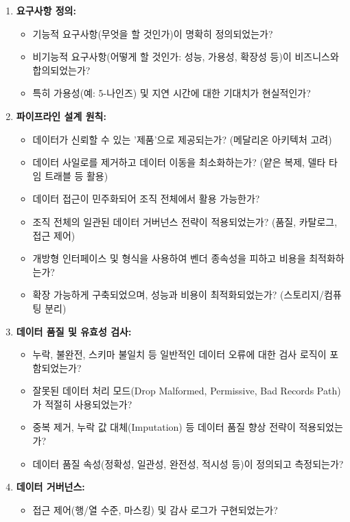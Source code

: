 \documentclass[11pt,a4paper]{article}
\begin{document}
\begin{enumerate}
\begin{enumerate}
    \item \textbf{요구사항 정의:}
    \begin{itemize}
        \item 기능적 요구사항(무엇을 할 것인가)이 명확히 정의되었는가?
        \item 비기능적 요구사항(어떻게 할 것인가: 성능, 가용성, 확장성 등)이 비즈니스와 합의되었는가?
        \item 특히 가용성(예: 5-나인즈) 및 지연 시간에 대한 기대치가 현실적인가?
    \end{itemize}
    \item \textbf{파이프라인 설계 원칙:}
    \begin{itemize}
        \item 데이터가 신뢰할 수 있는 '제품'으로 제공되는가? (메달리온 아키텍처 고려)
        \item 데이터 사일로를 제거하고 데이터 이동을 최소화하는가? (얕은 복제, 델타 타임 트래블 등 활용)
        \item 데이터 접근이 민주화되어 조직 전체에서 활용 가능한가?
        \item 조직 전체의 일관된 데이터 거버넌스 전략이 적용되었는가? (품질, 카탈로그, 접근 제어)
        \item 개방형 인터페이스 및 형식을 사용하여 벤더 종속성을 피하고 비용을 최적화하는가?
        \item 확장 가능하게 구축되었으며, 성능과 비용이 최적화되었는가? (스토리지/컴퓨팅 분리)
    \end{itemize}
    \item \textbf{데이터 품질 및 유효성 검사:}
    \begin{itemize}
        \item 누락, 불완전, 스키마 불일치 등 일반적인 데이터 오류에 대한 검사 로직이 포함되었는가?
        \item 잘못된 데이터 처리 모드(Drop Malformed, Permissive, Bad Records Path)가 적절히 사용되었는가?
        \item 중복 제거, 누락 값 대체(Imputation) 등 데이터 품질 향상 전략이 적용되었는가?
        \item 데이터 품질 속성(정확성, 일관성, 완전성, 적시성 등)이 정의되고 측정되는가?
    \end{itemize}
    \item \textbf{데이터 거버넌스:}
    \begin{itemize}
        \item 접근 제어(행/열 수준, 마스킹) 및 감사 로그가 구현되었는가?

\end{itemize}
\end{enumerate}
\end{enumerate}
\end{document}
